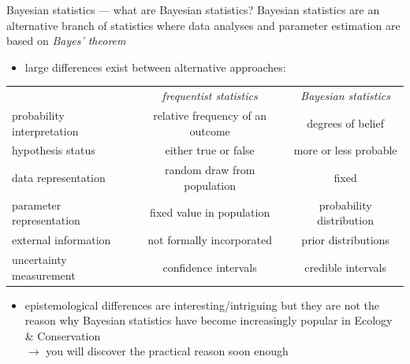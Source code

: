 \documentclass[
  ignorenonframetext,
  aspectratio=169,
  t]{beamer}
\providecommand{\tightlist}{%
  \setlength{\itemsep}{0pt}\setlength{\parskip}{0pt}}
\newcommand{\bluenorm}[1]{\textcolor{bluebeamer}{#1}}
\newcommand{\blueit}[1]{\textcolor{bluebeamer}{\emph{#1}}}
\begin{document}
\begin{frame}{Bayesian statistics --- what are Bayesian statistics?}
\protect{}\label{bayesian-statistics-what-are-bayesian-statistics}
Bayesian statistics are an alternative branch of statistics where data
analyses and parameter estimation are based on \blueit{Bayes' theorem}

\pause

\begin{itemize}
\tightlist
\item
  large differences exist between alternative approaches:
\end{itemize}

\begin{center}
\begin{small}
\begin{tabular}{|lcc|}
\hline & \blueit{frequentist statistics} & \blueit{Bayesian statistics}\\
\bluenorm{probability interpretation} & relative frequency of an outcome & degrees of belief \\
\bluenorm{hypothesis status} & either true or false & more or less probable\\
\bluenorm{data representation} & random draw from population & fixed\\
\bluenorm{parameter representation} & fixed value in population & probability distribution\\
\bluenorm{external information} & not formally incorporated & prior distributions\\
\bluenorm{uncertainty measurement} & confidence intervals & credible intervals\\
\hline
\end{tabular}
\end{small}
\end{center}

\pause

\begin{itemize}
\tightlist
\item
  \bluenorm{epistemological differences} are interesting/intriguing but
  they are not the reason why Bayesian statistics have become
  increasingly popular in Ecology \& Conservation\\
  \(\rightarrow\) you will discover the \bluenorm{practical reason} soon
  enough
\end{itemize}
\end{frame}
\end{document}
